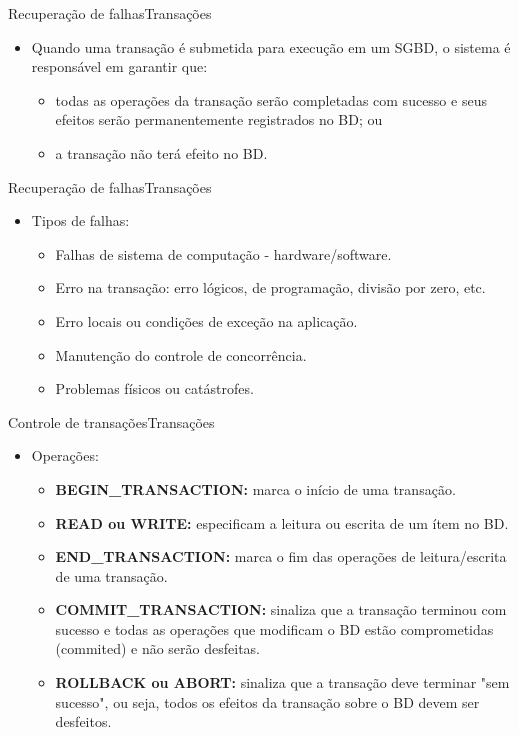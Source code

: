 \documentclass[t]{beamer}
\begin{document}

\begin{ftst}{Recuperação de falhas}{Transações}
\begin{itemize}
    \item Quando uma transação é submetida para execução em um SGBD, o sistema é responsável em garantir que:
    \vone
    \begin{itemize}
        \item todas as operações da transação serão completadas com sucesso e seus efeitos serão permanentemente registrados no BD; ou
        \item a transação não terá efeito no BD.
    \end{itemize}
\end{itemize}
\end{ftst}


\begin{ftst}{Recuperação de falhas}{Transações}
\begin{itemize}
    \item Tipos de falhas:
    \begin{itemize}
        \item Falhas de sistema de computação - hardware/software.
        \item Erro na transação: erro lógicos, de programação, divisão por zero, etc.
        \item Erro locais ou condições de exceção na aplicação.
        \item Manutenção do controle de concorrência.
        \item Problemas físicos ou catástrofes.
    \end{itemize}
\end{itemize}
\end{ftst}


\begin{ftst}{Controle de transações}{Transações}
\begin{itemize}
    \item Operações:
    \begin{itemize}
        \item \textbf{BEGIN\_TRANSACTION:} marca o início de uma transação.
        \item \textbf{READ ou WRITE:} especificam a leitura ou escrita de um ítem no BD.
        \item \textbf{END\_TRANSACTION:} marca o fim das operações de leitura/escrita de uma transação.
        \item \textbf{COMMIT\_TRANSACTION:} sinaliza que a transação terminou com sucesso e todas as operações que modificam o BD estão comprometidas (commited) e não serão desfeitas.
        \item \textbf{ROLLBACK ou ABORT:} sinaliza que a transação deve terminar "sem sucesso", ou seja, todos os efeitos da transação sobre o BD devem ser desfeitos.
    \end{itemize}
\end{itemize}
\end{ftst}
\end{document}
